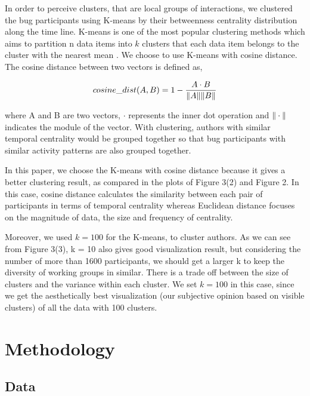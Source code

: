 \documentclass[conference]{IEEEtran}
\begin{document}
In order to perceive clusters, that are local groups of interactions,
we clustered the bug participants using K-means by their betweenness centrality
distribution along the time line.  
K-means is one of the most popular
clustering methods which aims to partition n data items into $k$ clusters that each data item belongs to the cluster with the nearest mean \cite{MATH:macqueen}. 
We choose to use K-means with cosine distance.
The
cosine distance between two vectors is defined as,

\begin{equation}
cosine\_dist(A,B) = 1-\frac{A\cdot B}{\Arrowvert A \Arrowvert \Arrowvert B \Arrowvert}
\end{equation}

where A and B are two vectors, $\cdot$ represents the inner dot
operation and $\Arrowvert \cdot \Arrowvert$ indicates the module of
the vector. With clustering, authors with similar temporal centrality would be
grouped together so that bug participants with similar activity
patterns are also grouped together. 

In this paper, we choose the K-means with cosine distance because it gives a better clustering result, as compared in the plots of Figure 3(2) and Figure 2.
In this case, cosine distance calculates the similarity between each pair of
participants in terms of temporal centrality whereas Euclidean distance
focuses on the magnitude of data, the size and frequency of centrality.

Moreover, we used $k = 100$ for the K-means, to cluster authors. As we can see from Figure 3(3), k = 10 also gives good visualization result, but considering the number of more than 1600 participants, we should get a larger k to keep the diversity of working groups in similar. There is a trade off between the size of clusters and the variance within each cluster. We set $k = 100$ in this case, since we get the aesthetically best visualization (our
subjective opinion based on visible clusters) of all the data with 100
clusters. 

\section{Methodology}
\label{methodology}
\subsection{Data}
\end{document}
